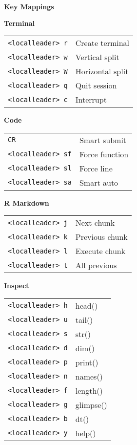 \documentclass[10pt,a4paper]{article}
\begin{document}
\begin{multicols}{3}
\footnotesize

\textbf{Key Mappings}

\textbf{Terminal}\\
\begin{tabular}{@{}L{2.44cm}L{3.51cm}@{}}
\texttt{<localleader> r} & Create terminal \\
\texttt{<localleader> w} & Vertical split \\
\texttt{<localleader> W} & Horizontal split \\
\texttt{<localleader> q} & Quit session \\
\texttt{<localleader> c} & Interrupt \\
\end{tabular}

\vspace{3pt}
\textbf{Code}\\
\begin{tabular}{@{}L{2.44cm}L{3.51cm}@{}}
\texttt{CR} & Smart submit \\
\texttt{<localleader> sf} & Force function \\
\texttt{<localleader> sl} & Force line \\
\texttt{<localleader> sa} & Smart auto \\
\end{tabular}

\vspace{3pt}
\textbf{R Markdown}\\
\begin{tabular}{@{}L{2.44cm}L{3.51cm}@{}}
\texttt{<localleader> j} & Next chunk \\
\texttt{<localleader> k} & Previous chunk \\
\texttt{<localleader> l} & Execute chunk \\
\texttt{<localleader> t} & All previous \\
\end{tabular}

\vspace{3pt}
\textbf{Inspect}\\
\begin{tabular}{@{}L{2.44cm}L{3.51cm}@{}}
\texttt{<localleader> h} & head() \\
\texttt{<localleader> u} & tail() \\
\texttt{<localleader> s} & str() \\
\texttt{<localleader> d} & dim() \\
\texttt{<localleader> p} & print() \\
\texttt{<localleader> n} & names() \\
\texttt{<localleader> f} & length() \\
\texttt{<localleader> g} & glimpse() \\
\texttt{<localleader> b} & dt() \\
\texttt{<localleader> y} & help() \\
\end{tabular}


\end{multicols}
\end{document}
